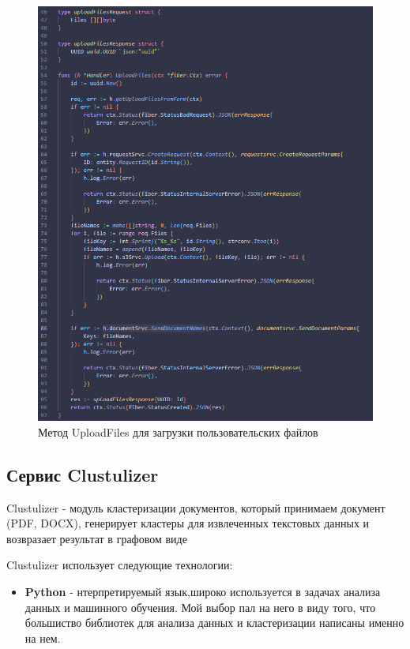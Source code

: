 \begin{itemize}
\begin{figure}[H]
    \centering
    \includegraphics[width=1\textwidth]{styles/diploma/inc/handler1.png} 
    \caption{Метод UploadFiles для загрузки пользовательских файлов}
    \label{fig:example}
\end{figure}

\subsection{Сервис Clustulizer}
Clustulizer -  модуль кластеризации документов, который принимаем документ (PDF, DOCX), генерирует кластеры для извлеченных текстовых данных и возвразает результат в графовом виде

Clustulizer использует следующие технологии:
\begin{itemize}
\item  \textbf{Python} - нтерпретируемый язык,широко используется в задачах анализа данных и машинного обучения. Мой выбор пал на него в виду того, что большиство библиотек для анализа данных и кластеризации написаны именно на нем.



\end{itemize}
\end{itemize}

